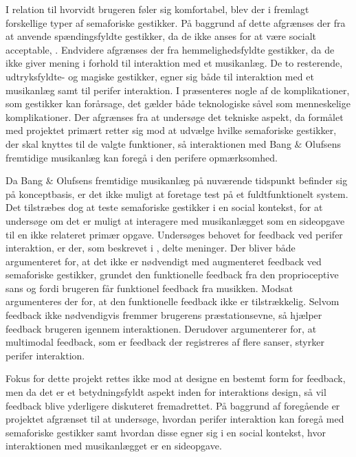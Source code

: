 I relation til hvorvidt brugeren føler sig komfortabel, blev der i  fremlagt forskellige typer af semaforiske gestikker. På baggrund af dette afgrænses der fra at anvende spændingsfyldte gestikker, da de ikke anses for at være socialt acceptable, \parencite[s. 277]{PDF:WouldYouDoThat}. Endvidere afgrænses der fra hemmelighedsfyldte gestikker, da de ikke giver mening i forhold til interaktion med et musikanlæg. De to resterende, udtryksfyldte- og magiske gestikker, egner sig både til interaktion med et musikanlæg samt til perifer interaktion.\blankline
%
I  præsenteres nogle af de komplikationer, som gestikker kan forårsage, det gælder både teknologiske såvel som menneskelige komplikationer. Der afgrænses fra at undersøge det tekniske aspekt, da formålet med projektet primært retter sig mod at udvælge hvilke semaforiske gestikker, der skal knyttes til de valgte funktioner, så interaktionen med Bang $\&$ Olufsens fremtidige musikanlæg kan foregå i den perifere opmærksomhed.

Da Bang $\&$ Olufsens fremtidige musikanlæg på nuværende tidspunkt befinder sig på konceptbasis, er det ikke muligt at foretage test på et fuldtfunktionelt system. Det tilstræbes dog at teste semaforiske gestikker i en social kontekst, for at undersøge om det er muligt at interagere med musikanlægget som en sideopgave til en ikke relateret primær opgave.\blankline
%
Undersøges behovet for feedback ved perifer interaktion, er der, som beskrevet i , delte meninger. Der bliver både argumenteret for, at det ikke er nødvendigt med augmenteret feedback ved semaforiske gestikker, grundet den funktionelle feedback fra den proprioceptive sans og fordi brugeren får funktionel feedback fra musikken. Modsat argumenteres der for, at den funktionelle feedback ikke er tilstrækkelig. Selvom feedback ikke nødvendigvis fremmer brugerens præstationsevne, så hjælper feedback brugeren igennem interaktionen. Derudover argumenterer \textcite[s. 21]{PDF:FacilitatingPIDesignAndEvaluation} for, at multimodal feedback, som er feedback der registreres af flere sanser, styrker perifer interaktion. 

Fokus for dette projekt rettes ikke mod at designe en bestemt form for feedback, men da det er et betydningsfyldt aspekt inden for interaktions design, så vil feedback blive yderligere diskuteret fremadrettet.\blankline
%
På baggrund af foregående er projektet afgrænset til at undersøge, hvordan perifer interaktion kan foregå med semaforiske gestikker samt hvordan disse egner sig i en social kontekst, hvor interaktionen med musikanlægget er en sideopgave. 
